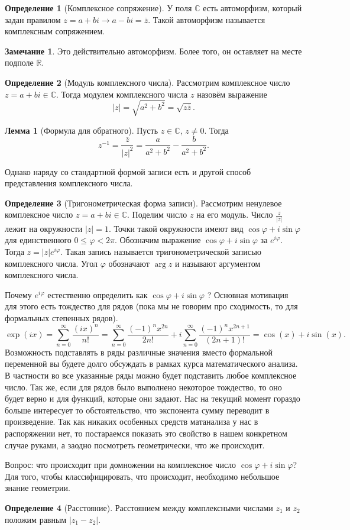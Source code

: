 \documentclass[10pt,a4paper,oneside]{book}
\theoremstyle{definition}
\newtheorem*{rem}{Замечание}
\newtheorem{defn}{Определение}
\newtheorem{lem}{Лемма}
\newcommand{\mb}[1]{\mathbb{#1}}
\newcommand{\ovl}{\overline}
\def\dfn{\begin{defn}}
\def\edfn{\end{defn}}
\def\lm{\begin{lem}}
\def\elm{\end{lem}}
\def\rm{\begin{rem}}
\def\erm{\end{rem}}
\begin{document}
\dfn[Комплексное сопряжение] У поля $\mb C$ есть автоморфизм, который задан правилом $z=a+bi \to a-bi=\ovl{z}$. Такой автоморфизм называется комплексным сопряжением.
\edfn

\rm Это действительно автоморфизм. Более того, он оставляет на месте подполе $\mb R$.
\proof 
\endproof
\erm
 
\dfn[Модуль комплексного числа] Рассмотрим комплексное число $z=a+bi\in \mb C$. Тогда модулем комплексного числа $z$ назовём выражение
$$|z|=\sqrt{a^2+b^2}=\sqrt{z\ovl{z}}.$$
\edfn

\lm[Формула для обратного] Пусть $z\in \mb C$, $z\neq 0$. Тогда
$$ z^{-1} =\frac{\ovl{z}}{|z|^2}= \frac{a}{a^2+b^2}-\frac{b}{a^2+b^2}.$$
\elm

Однако наряду со стандартной формой записи есть и другой способ представления комплексного числа.

\dfn[Тригонометрическая форма записи] Рассмотрим ненулевое комплексное число $z= a+bi\in\mb C$. Поделим число $z$ на его модуль. Число
$\frac{z}{|z|}$ лежит на окружности $|z| = 1$. Точки такой окружности имеют вид $\cos\varphi +i\sin\varphi$ для единственного $0 \leq \varphi < 2\pi$. Обозначим выражение $\cos\varphi+i\sin\varphi$ за $e^{i\varphi}$. Тогда $z=|z|e^{i\varphi}$.
Такая запись называется тригонометрической записью комплексного числа. Угол $\varphi$ обозначают $\arg z$ и называют
аргументом комплексного числа.
\edfn


Почему $e^{i\varphi}$ естественно определить как $\cos\varphi+i\sin \varphi$ ? Основная мотивация для этого есть тождество для рядов  (пока мы не говорим про сходимость, то для формальных степенных рядов).
$$\exp(ix) = \sum_{n=0}^{\infty} \frac{(ix)^n}{n!}=\sum_{n=0}^{\infty} \frac{(-1)^n x^{2n}}{2n!} + i\sum_{n=0}^{\infty} \frac{(-1)^n x^{2n+1}}{(2n+1)!}= \cos(x) + i\sin(x).$$
Возможность подставлять в ряды различные значения вместо формальной переменной вы будете долго обсуждать в рамках курса математического анализа. В частности во все указанные ряды можно будет подставить любое комплексное число. Так же, если для рядов было выполнено некоторое тождество, то оно будет верно и для функций, которые они задают.
Нас на текущий момент гораздо больше  интересует то обстоятельство, что экспонента сумму переводит в произведение. Так как никаких особенных средств матанализа у нас в распоряжении нет, то постараемся показать это свойство в нашем конкретном случае руками, а заодно посмотреть геометрически, что же происходит.


Вопрос: что происходит при домножении на комплексное число $\cos \varphi + i \sin \varphi$? Для того, чтобы классифицировать,
что происходит, необходимо небольшое знание геометрии.
\dfn[Расстояние] Расстоянием между комплексными числами $z_1$ и $z_2$ положим равным $|z_1-z_2 |$.
\edfn
\end{document}
